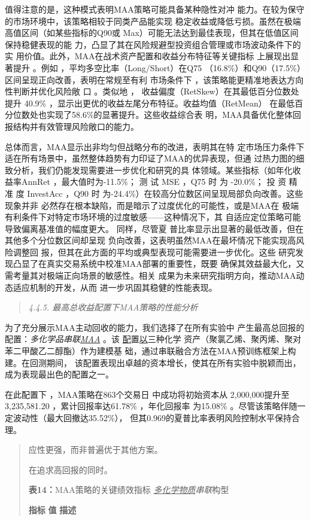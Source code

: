 \documentclass[UTF8]{ctexart}
\begin{document}
值得注意的是，这种模式表明MAA策略可能具备某种隐性对冲
能力。在较为保守的市场环境中，该策略相较于同类产品能实现
稳定收益或降低亏损。虽然在极端高值区间（如某些指标的Q90或
Max）可能无法达到最佳表现，但其在低值区间保持稳健表现的能
力，凸显了其在风险规避型投资组合管理或市场波动条件下的实
用价值。此外，MAA在战术资产配置和收益分布特征等关键指标 上展现出显著提升
。例如 ，平均多空比率（Long/Short）在Q75
（16.8\%）和Q90（17.5\%）区间呈现正向改善，表明在常规至有利 市场条件下
，该策略能更精准地表达方向性判断并优化风险敞 口 。类似地 ，
收益偏度（RetSkew）在其最低百分位数处提升 40.9\%
，显示出更优的收益左尾分布特征。收益均值（RetMean）
在最低百分位数处也实现了58.6\%的显著提升。这些收益综合表
明，MAA具备优化整体回报结构并有效管理风险敞口的能力。

总体而言，MAA显示出非均匀但战略分布的改进，表明其在特
定市场压力条件下适在所有场景中，虽然整体趋势有力印证了MAA的优异表现，但通
过热力图的细致分析，我们仍能发现需要进一步优化和研究的具
体领域。某些指标（如年化收益率AnnRet ，最大值时为-11.5\%； 测 试 MSE
，Q75 时 为 -20.0\%； 投 资 精 准 度 InvestAcc ，Q90 时
为-24.4\%）在较高分位数区间呈现局部负向改善。这些现象并非
必然存在根本缺陷，而是暗示了过度优化的可能性，或是MAA在
极端有利条件下对特定市场环境的过度敏感------这种情况下，其
自适应定位策略可能导致偏离基准值的幅度更大。 同样，尽管夏
普比率显示出显著的最低改善，但在其他多个分位数区间却呈现
负向改善，这表明虽然MAA在最坏情况下能实现高风险调整回
报，但其在此方面的平均或典型表现可能需要进一步优化。这些
研究发现凸显了在真实交易系统中校准MAA部署的重要性，既要
确保其效益最大化，又需考量其对极端正向场景的敏感性。相关
成果为未来研究指明方向，推动MAA动态适应机制的开发，从而
进一步巩固其稳健的性能表现。

\begin{quote}
\emph{4.4.5. 最高总收益配置下MAA策略的性能分析}
\end{quote}

为了充分展示MAA主动回收的能力，我们选择了在所有实验中
产生最高总回报的配置：\emph{多化学品串联\ul{MAA}} 。该
\ul{配}置\ul{以}三种化学
资产（聚氯乙烯、聚丙烯、聚对苯二甲酸乙二醇酯）作为建模基
础，通过串联融合方法在MAA预训练框架上构建。在回测期间，
该配置表现出卓越的资本增长，使其在所有实验中脱颖而出，成为表现最出色的配置之一。

在此配置下 ，MAA策略在863个交易日 中成功将初始资本从
2,000,000提升至3,235,581.20 ，累计回报率达61.78\% ，年化回报率 为15.08\%
。尽管该策略伴随一定波动性（最大回撤达35.52\%），
但其0.969的夏普比率表明风险控制水平保持合理。

\begin{quote}
应性更强，而非普遍优于其他方案。

在追求高回报的同时。

\textbf{表14：}MAA策略的关键绩效指标 \emph{\ul{多化学物质}串联}构型

\textbf{指标} \textbf{值} \textbf{描述}
\end{quote}
\end{document}
